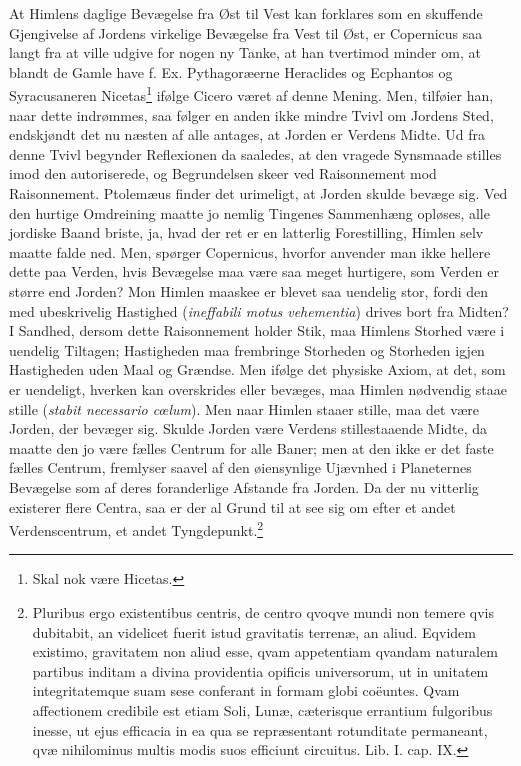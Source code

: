 \documentclass[12pt,a4paper]{book}
\begin{document}
At Himlens daglige Bevægelse fra Øst til Vest kan forklares som en
skuffende Gjengivelse af Jordens virkelige Bevægelse fra Vest til Øst,
er Copernicus saa langt fra at ville udgive for nogen ny Tanke, at han
tvertimod minder om, at blandt de Gamle have f. Ex. Pythagoræerne
Heraclides og Ecphantos og Syracusaneren
Nicetas\footnote{%
Skal nok være Hicetas.} ifølge Cicero været af denne Mening. Men,
tilføier han, naar dette indrømmes, saa følger en anden ikke mindre
Tvivl om Jordens Sted, endskjøndt det nu næsten af alle antages, at
Jorden er Verdens Midte. Ud fra denne Tvivl begynder Reflexionen da
saaledes, at den vragede Synsmaade stilles imod den autoriserede, og
Begrundelsen skeer ved Raisonnement mod Raisonnement. Ptolemæus finder
det urimeligt, at Jorden skulde bevæge sig. Ved den hurtige Omdreining
maatte jo nemlig Tingenes Sammenhæng opløses, alle jordiske Baand
briste, ja, hvad der ret er en latterlig Forestilling, Himlen selv
maatte falde ned. Men, spørger Copernicus, hvorfor anvender man ikke
hellere dette paa Verden, hvis Bevægelse maa være saa meget hurtigere,
som Verden er større end Jorden? Mon Himlen maaskee er blevet saa
uendelig stor, fordi den med ubeskrivelig Hastighed
(\textit{ineffabili motus vehementia}) drives bort fra Midten? I
Sandhed, dersom dette Raisonnement holder Stik, maa Himlens Storhed
være i uendelig Tiltagen; Hastigheden maa frembringe Storheden og
Storheden igjen Hastigheden uden Maal og Grændse. Men ifølge det
physiske Axiom, at det, som er uendeligt, hverken kan overskrides eller
bevæges, maa Himlen nødvendig staae stille (\textit{stabit necessario
cœlum}). Men naar Himlen staaer
stille, maa det være Jorden, der bevæger sig. Skulde Jorden være
Verdens stillestaaende Midte, da maatte den jo være fælles Centrum for
alle Baner; men at den ikke er det faste fælles Centrum, fremlyser
saavel af den øiensynlige Ujævnhed i Planeternes Bevægelse som af deres
foranderlige Afstande fra Jorden. Da der nu vitterlig existerer flere
Centra, saa er der al Grund til at see sig om efter et andet
Verdenscentrum, et andet
Tyngdepunkt.\footnote{%
Pluribus ergo existentibus centris, de centro qvoqve mundi non temere
qvis dubitabit, an videlicet fuerit istud gravitatis terrenæ, an aliud.
Eqvidem existimo, gravitatem non aliud esse, qvam appetentiam qvandam
naturalem partibus inditam a divina providentia opificis universorum,
ut in unitatem integritatemque suam sese conferant in formam globi
coëuntes. Qvam affectionem credibile est etiam Soli, Lunæ, cæterisque
errantium fulgoribus inesse, ut ejus efficacia in ea qua se
repræsentant rotunditate permaneant, qvæ nihilominus multis modis suos
efficiunt circuitus. Lib. I. cap. IX.}
\end{document}
